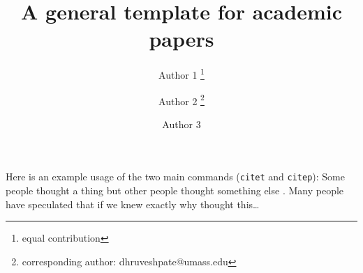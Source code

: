 \documentclass{article}
\title{A general template for academic papers}
\author[$\diamondsuit$]{Author 1 \thanks{equal contribution}}
\author[$\diamondsuit$,$\heartsuit$]{Author 2 \protect\footnotemark[\value{footnote}]\thanks{corresponding author: dhruveshpate@umass.edu}} %
\author[$\heartsuit$]{Author 3}
\affil[$\diamondsuit$]{
	University of Massachusetts Amherst}
\affil[$\heartsuit$]{
University of Massachusetts Amherst}
\date{}
\begin{document}
\maketitle







Here is an example usage of the two main commands (\verb+citet+ and \verb+citep+): Some people thought a thing \citep{kour2014real} but other people thought something else \citep{kour2014real}. Many people have speculated that if we knew exactly why \citet{kour2014real} thought this\dots






\end{document}

